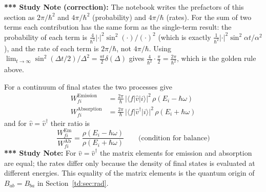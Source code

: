 \documentclass[11pt,a4paper]{article}
\begin{document}
\begin{center}
\end{center}

\textbf{*** Study Note (correction):} The notebook writes the prefactors of this section as $2\pi/\hbar^2$ and $4\pi/\hbar^2$ (probability) and $4\pi/\hbar$ (rates). For the sum of two terms each contribution has the same form as the single-term result: the probability of each term is $\frac4{\hbar^2}|\cdot|^2\sin^2(\cdot)/(\cdot)^2$ (which is exactly $\frac1{\hbar^2}|\cdot|^2\sin^2\alpha t/\alpha^2$), and the rate of each term is $2\pi/\hbar$, not $4\pi/\hbar$. Using $\lim_{t\to\infty}\sin^2(\Delta t/2)/\Delta^2=\frac{\pi t}2\delta(\Delta)$ gives $\frac4{\hbar^2}\cdot\frac\pi2=\frac{2\pi}{\hbar^2}$, which is the golden rule above.

For a continuum of final states the two processes give
\begin{align*}
W_{fi}^{\text{Emission}}&=\frac{2\pi}\hbar\,|\langle f|\hat v|i\rangle|^2\,\rho(E_i-\hbar\omega)\\
W_{fi}^{\text{Absorption}}&=\frac{2\pi}\hbar\,|\langle f|\hat v^\dagger|i\rangle|^2\,\rho(E_i+\hbar\omega)
\end{align*}
and for $\hat v=\hat v^\dagger$ their ratio is
\[
\frac{W_{fi}^{\text{Em}}}{W_{fi}^{\text{Ab}}}=\frac{\rho(E_i-\hbar\omega)}{\rho(E_i+\hbar\omega)}\qquad\text{(condition for balance)}
\]
\textbf{*** Study Note:} For $\hat v=\hat v^\dagger$ the matrix elements for emission and absorption are equal; the rates differ only because the density of final states is evaluated at different energies. This equality of the matrix elements is the quantum origin of $B_{ab}=B_{ba}$ in Section~\ref{td:sec:rad}.
\end{document}
